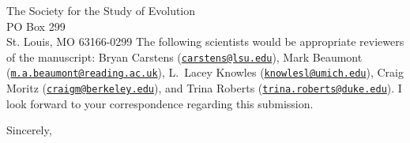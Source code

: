 \documentclass[letterpaper]{letter}
\begin{document}
\begin{letter}{The Society for the Study of Evolution \\
                     PO Box 299 \\
                     St. Louis, MO 63166-0299}
The following scientists would be appropriate reviewers of the manuscript:
Bryan Carstens (\href{mailto:carstens@lsu.edu}{\tt carstens@lsu.edu}),
Mark Beaumont (\href{mailto:m.a.beaumont@reading.ac.uk}{\tt m.a.beaumont@reading.ac.uk}),
L.\ Lacey Knowles (\href{knowlesl@umich.edu}{\tt knowlesl@umich.edu}),
Craig Moritz (\href{mailto:craigm@berkeley.edu}{\tt craigm@berkeley.edu}), and
Trina Roberts (\href{mailto:trina.roberts@duke.edu}{\tt trina.roberts@duke.edu}).
I look forward to your correspondence regarding this submission.

\addtolength{\medskipamount}{-5pt}
\closing{Sincerely,}
\end{letter}
\end{document}
